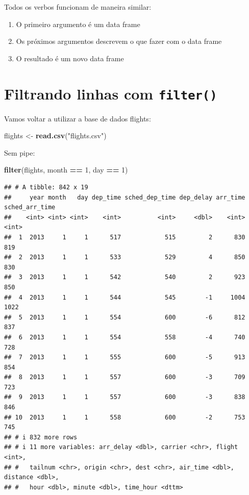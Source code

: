 \documentclass[
]{book}
\newenvironment{Shaded}{\begin{snugshade}}{\end{snugshade}}
\newcommand{\DecValTok}[1]{\textcolor[rgb]{0.00,0.00,0.81}{#1}}
\newcommand{\FunctionTok}[1]{\textcolor[rgb]{0.13,0.29,0.53}{\textbf{#1}}}
\newcommand{\NormalTok}[1]{#1}
\newcommand{\OtherTok}[1]{\textcolor[rgb]{0.56,0.35,0.01}{#1}}
\newcommand{\SpecialCharTok}[1]{\textcolor[rgb]{0.81,0.36,0.00}{\textbf{#1}}}
\newcommand{\StringTok}[1]{\textcolor[rgb]{0.31,0.60,0.02}{#1}}
\providecommand{\tightlist}{%
  \setlength{\itemsep}{0pt}\setlength{\parskip}{0pt}}
\begin{document}
Todos os verbos funcionam de maneira similar:

\begin{enumerate}
\def\labelenumi{\arabic{enumi}.}
\tightlist
\item
  O primeiro argumento é um data frame
  \vspace{2mm}
\item
  Os próximos argumentos descrevem o que fazer com o data frame
  \vspace{2mm}
\item
  O resultado é um novo data frame
\end{enumerate}

\section{\texorpdfstring{Filtrando linhas com \texttt{filter()}}{Filtrando linhas com filter()}}\label{filtrando-linhas-com-filter}

Vamos voltar a utilizar a base de dados flights:

\begin{Shaded}
\begin{Highlighting}[]
\NormalTok{flights }\OtherTok{\textless{}{-}} \FunctionTok{read.csv}\NormalTok{(}\StringTok{"flights.csv"}\NormalTok{)}
\end{Highlighting}
\end{Shaded}

Sem pipe:

\begin{Shaded}
\begin{Highlighting}[]
\FunctionTok{filter}\NormalTok{(flights, month }\SpecialCharTok{==} \DecValTok{1}\NormalTok{, day }\SpecialCharTok{==} \DecValTok{1}\NormalTok{)}
\end{Highlighting}
\end{Shaded}

\begin{verbatim}
## # A tibble: 842 x 19
##     year month   day dep_time sched_dep_time dep_delay arr_time sched_arr_time
##    <int> <int> <int>    <int>          <int>     <dbl>    <int>          <int>
##  1  2013     1     1      517            515         2      830            819
##  2  2013     1     1      533            529         4      850            830
##  3  2013     1     1      542            540         2      923            850
##  4  2013     1     1      544            545        -1     1004           1022
##  5  2013     1     1      554            600        -6      812            837
##  6  2013     1     1      554            558        -4      740            728
##  7  2013     1     1      555            600        -5      913            854
##  8  2013     1     1      557            600        -3      709            723
##  9  2013     1     1      557            600        -3      838            846
## 10  2013     1     1      558            600        -2      753            745
## # i 832 more rows
## # i 11 more variables: arr_delay <dbl>, carrier <chr>, flight <int>,
## #   tailnum <chr>, origin <chr>, dest <chr>, air_time <dbl>, distance <dbl>,
## #   hour <dbl>, minute <dbl>, time_hour <dttm>
\end{verbatim}
\end{document}
